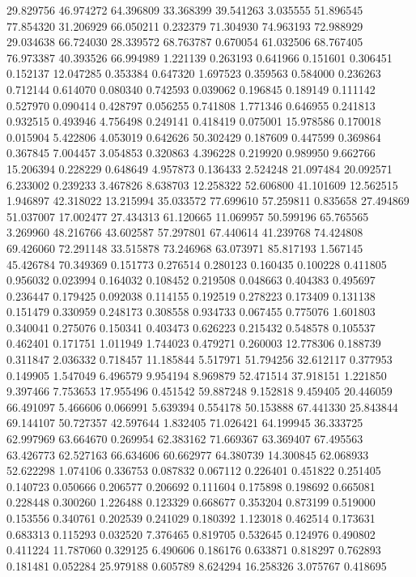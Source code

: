 29.829756
46.974272
64.396809
33.368399
39.541263
3.035555
51.896545
77.854320
31.206929
66.050211
0.232379
71.304930
74.963193
72.988929
29.034638
66.724030
28.339572
68.763787
0.670054
61.032506
68.767405
76.973387
40.393526
66.994989
1.221139
0.263193
0.641966
0.151601
0.306451
0.152137
12.047285
0.353384
0.647320
1.697523
0.359563
0.584000
0.236263
0.712144
0.614070
0.080340
0.742593
0.039062
0.196845
0.189149
0.111142
0.527970
0.090414
0.428797
0.056255
0.741808
1.771346
0.646955
0.241813
0.932515
0.493946
4.756498
0.249141
0.418419
0.075001
15.978586
0.170018
0.015904
5.422806
4.053019
0.642626
50.302429
0.187609
0.447599
0.369864
0.367845
7.004457
3.054853
0.320863
4.396228
0.219920
0.989950
9.662766
15.206394
0.228229
0.648649
4.957873
0.136433
2.524248
21.097484
20.092571
6.233002
0.239233
3.467826
8.638703
12.258322
52.606800
41.101609
12.562515
1.946897
42.318022
13.215994
35.033572
77.699610
57.259811
0.835658
27.494869
51.037007
17.002477
27.434313
61.120665
11.069957
50.599196
65.765565
3.269960
48.216766
43.602587
57.297801
67.440614
41.239768
74.424808
69.426060
72.291148
33.515878
73.246968
63.073971
85.817193
1.567145
45.426784
70.349369
0.151773
0.276514
0.280123
0.160435
0.100228
0.411805
0.956032
0.023994
0.164032
0.108452
0.219508
0.048663
0.404383
0.495697
0.236447
0.179425
0.092038
0.114155
0.192519
0.278223
0.173409
0.131138
0.151479
0.330959
0.248173
0.308558
0.934733
0.067455
0.775076
1.601803
0.340041
0.275076
0.150341
0.403473
0.626223
0.215432
0.548578
0.105537
0.462401
0.171751
1.011949
1.744023
0.479271
0.260003
12.778306
0.188739
0.311847
2.036332
0.718457
11.185844
5.517971
51.794256
32.612117
0.377953
0.149905
1.547049
6.496579
9.954194
8.969879
52.471514
37.918151
1.221850
9.397466
7.753653
17.955496
0.451542
59.887248
9.152818
9.459405
20.446059
66.491097
5.466606
0.066991
5.639394
0.554178
50.153888
67.441330
25.843844
69.144107
50.727357
42.597644
1.832405
71.026421
64.199945
36.333725
62.997969
63.664670
0.269954
62.383162
71.669367
63.369407
67.495563
63.426773
62.527163
66.634606
60.662977
64.380739
14.300845
62.068933
52.622298
1.074106
0.336753
0.087832
0.067112
0.226401
0.451822
0.251405
0.140723
0.050666
0.206577
0.206692
0.111604
0.175898
0.198692
0.665081
0.228448
0.300260
1.226488
0.123329
0.668677
0.353204
0.873199
0.519000
0.153556
0.340761
0.202539
0.241029
0.180392
1.123018
0.462514
0.173631
0.683313
0.115293
0.032520
7.376465
0.819705
0.532645
0.124976
0.490802
0.411224
11.787060
0.329125
6.490606
0.186176
0.633871
0.818297
0.762893
0.181481
0.052284
25.979188
0.605789
8.624294
16.258326
3.075767
0.418695
